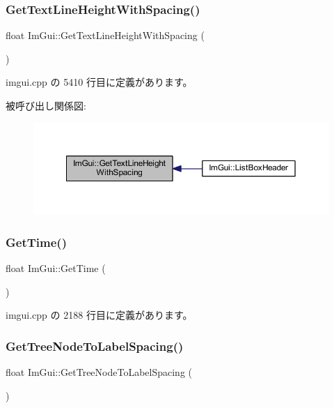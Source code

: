 \subsubsection{\texorpdfstring{Get\+Text\+Line\+Height\+With\+Spacing()}{GetTextLineHeightWithSpacing()}}
{\footnotesize\ttfamily float Im\+Gui\+::\+Get\+Text\+Line\+Height\+With\+Spacing (\begin{DoxyParamCaption}{ }\end{DoxyParamCaption})}



 imgui.\+cpp の 5410 行目に定義があります。

被呼び出し関係図\+:\nopagebreak
\begin{figure}[H]
\begin{center}
\leavevmode
\includegraphics[width=350pt]{namespace_im_gui_aa1616f6082fd210fde8d98c511bf8f56_icgraph}
\end{center}
\end{figure}
\mbox{\label{namespace_im_gui_ab8d8a7a9e1a0e84e636202ec74733db9}} 
\subsubsection{\texorpdfstring{Get\+Time()}{GetTime()}}
{\footnotesize\ttfamily float Im\+Gui\+::\+Get\+Time (\begin{DoxyParamCaption}{ }\end{DoxyParamCaption})}



 imgui.\+cpp の 2188 行目に定義があります。

\mbox{\label{namespace_im_gui_a5c89cb6b42296d0f7db75027efc0fb7a}} 
\subsubsection{\texorpdfstring{Get\+Tree\+Node\+To\+Label\+Spacing()}{GetTreeNodeToLabelSpacing()}}
{\footnotesize\ttfamily float Im\+Gui\+::\+Get\+Tree\+Node\+To\+Label\+Spacing (\begin{DoxyParamCaption}{ }\end{DoxyParamCaption})}



